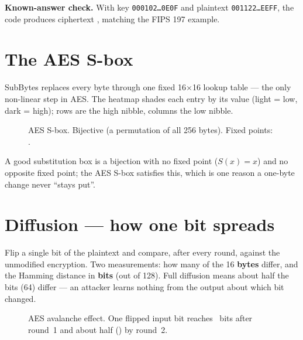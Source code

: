 \documentclass[11pt,a4paper]{article}
\begin{document}
\noindent\textbf{Known-answer check.} With key \texttt{000102\dots0E0F} and
plaintext \texttt{001122\dots EEFF}, the code produces ciphertext
\texttt{\AEScipher}, matching the FIPS 197 example.

\section{The AES S-box}

SubBytes replaces every byte through one fixed 16$\times$16 lookup table --- the
only non-linear step in AES. The heatmap shades each entry by its value (light =
low, dark = high); rows are the high nibble, columns the low nibble.

\begin{figure}[H]\centering
{}
\caption{AES S-box. Bijective (a permutation of all 256 bytes). Fixed points: \AESfixed.}
\end{figure}

A good substitution box is a bijection with no fixed point ($S(x)=x$) and no
opposite fixed point; the AES S-box satisfies this, which is one reason a
one-byte change never ``stays put''.

\section{Diffusion --- how one bit spreads}

Flip a single bit of the plaintext and compare, after every round, against the
unmodified encryption. Two measurements: how many of the 16 \textbf{bytes}
differ, and the Hamming distance in \textbf{bits} (out of 128). Full diffusion
means about half the bits (64) differ --- an attacker learns nothing from the
output about which bit changed.

\begin{figure}[H]\centering
{}
\caption{AES avalanche effect. One flipped input bit reaches \AESbitsreached\ bits
after round~1 and about half (\AESbitsfull) by round~2.}
\end{figure}
\end{document}
